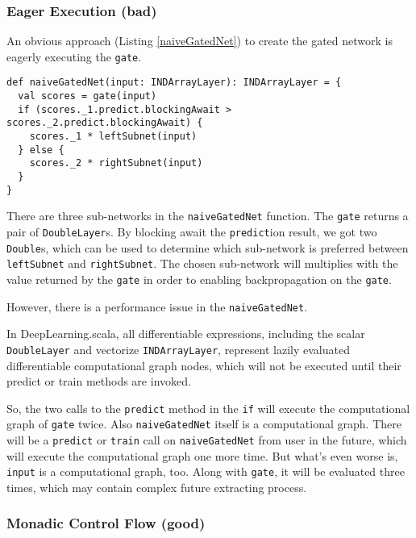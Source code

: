 \subsubsection{Eager Execution (bad)\label{eager}}

An obvious approach (Listing \ref{naiveGatedNet}) to create the gated network is eagerly executing the \lstinline{gate}.

\begin{lstlisting}[caption={The eager execution implementation of gated network}, label={naiveGatedNet}]
def naiveGatedNet(input: INDArrayLayer): INDArrayLayer = {
  val scores = gate(input)
  if (scores._1.predict.blockingAwait > scores._2.predict.blockingAwait) {
    scores._1 * leftSubnet(input)
  } else {
    scores._2 * rightSubnet(input)
  }
}
\end{lstlisting}

There are three sub-networks in the \lstinline{naiveGatedNet} function. The \lstinline{gate} returns a pair of \lstinline{DoubleLayer}s. By blocking await the \lstinline{predict}ion result, we got two \lstinline{Double}s, which can be used to determine which sub-network is preferred between \lstinline{leftSubnet} and \lstinline{rightSubnet}. The chosen sub-network will multiplies with the value returned by the \lstinline{gate} in order to enabling backpropagation on the \lstinline{gate}.

However, there is a performance issue in the \lstinline{naiveGatedNet}.

In DeepLearning.scala, all differentiable expressions, including the scalar \lstinline{DoubleLayer} and vectorize \lstinline{INDArrayLayer}, represent lazily evaluated differentiable computational graph nodes, which will not be executed until their predict or train methods are invoked.

So, the two calls to the \lstinline{predict} method in the \lstinline{if} will execute the computational graph of \lstinline{gate} twice. Also \lstinline{naiveGatedNet} itself is a computational graph. There will be a \lstinline{predict} or \lstinline{train} call on \lstinline{naiveGatedNet} from user in the future, which will execute the computational graph one more time. But what's even worse is, \lstinline{input} is a computational graph, too. Along with \lstinline{gate}, it will be evaluated three times, which may contain complex future extracting process.

\subsubsection{Monadic Control Flow (good)\label{monadic}}


